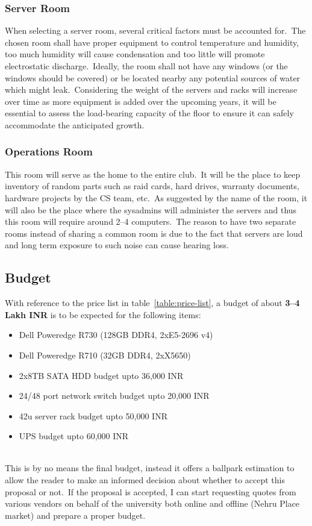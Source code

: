 \subsubsection{Server Room}
When selecting a server room, several critical factors must be accounted for.\ The chosen room shall have proper
equipment to control temperature and humidity, too much humidity will cause condensation and too little will promote
electrostatic discharge.\ Ideally, the room shall not have any windows (or the windows should be covered) or be located
nearby any potential sources of water which might leak.\ Considering the weight of the servers and racks will increase
over time as more equipment is added over the upcoming years, it will be essential to assess the load-bearing capacity
of the floor to ensure it can safely accommodate the anticipated growth.

\subsubsection{Operations Room}
This room will serve as the home to the entire club.\ It will be the place to keep inventory of random parts such as
raid cards, hard drives, warranty documents, hardware projects by the CS team, etc.\ As suggested by the name of the
room, it will also be the place where the sysadmins will administer the servers and thus this room will require around
2--4 computers.\ The reason to have two separate rooms instead of sharing a common room is due to the fact that servers
are loud and long term exposure to such noise can cause hearing loss.


\subsection{Budget}\label{subsec:budget}
With reference to the price list in table~\ref{table:price-list}, a budget of about \textbf{\large3--4 Lakh INR} is
to be expected for the following items:
\begin{itemize}
    \item Dell Poweredge R730 (128GB DDR4, 2xE5-2696 v4)
    \item Dell Poweredge R710 (32GB DDR4, 2xX5650)
    \item 2x8TB SATA HDD budget upto 36,000 INR
    \item 24/48 port network switch budget upto 20,000 INR
    \item 42u server rack budget upto 50,000 INR
    \item UPS budget upto 60,000 INR
\end{itemize}
\\
This is by no means the final budget, instead it offers a ballpark estimation to allow the reader to make an informed
decision about whether to accept this proposal or not.\ If the proposal is accepted, I can start requesting quotes
from various vendors on behalf of the university both online and offline (Nehru Place market) and prepare a proper
budget.



